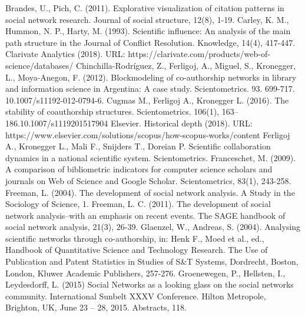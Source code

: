 \documentclass[11pt]{article} %
\begin{document}
\begin{thebibliography}{99}
   Brandes, U., Pich, C. (2011). Explorative visualization of citation patterns in social network research. Journal of social structure, 12(8), 1-19.
   Carley, K. M., Hummon, N. P., Harty, M. (1993). Scientific influence: An analysis of the main path structure in the Journal of Conflict Resolution. Knowledge, 14(4), 417-447.
   Clarivate Analytics (2018). URL: https://clarivate.com/products/web-of-science/databases/
   Chinchilla-Rodríguez, Z., Ferligoj, A., Miguel, S., Kronegger, L., Moya-Anegon, F. (2012). Blockmodeling of co-authorship networks in library and information science in Argentina: A case study. Scientometrics. 93. 699-717. 10.1007/s11192-012-0794-6.
   Cugmas M., Ferligoj A., Kronegger L. (2016). The stability of coauthorship structures. Scientometrics. 106(1), 163–186.10.1007/s1119201517904
   Elsevier. Historical depth (2018). URL: https://www.elsevier.com/solutions/scopus/how-scopus-works/content
   Ferligoj A., Kronegger L., Mali F., Snijders T., Doreian P. Scientific collaboration dynamics in a national scientific system. Scientometrics.
   Franceschet, M. (2009). A comparison of bibliometric indicators for computer science scholars and journals on Web of Science and Google Scholar. Scientometrics, 83(1), 243-258.
   Freeman, L. (2004). The development of social network analysis. A Study in the Sociology of Science, 1.
   Freeman, L. C. (2011). The development of social network analysis–with an emphasis on recent events. The SAGE handbook of social network analysis, 21(3), 26-39.
   Glaenzel, W., Andreas, S. (2004). Analysing scientific networks through co-authorship, in: Henk F., Moed et al., ed., Handbook of Quantitative Science and Technology Research. The Use of Publication and Patent Statistics in Studies of S\&T Systems, Dordrecht, Boston, London, Kluwer Academic Publishers, 257-276.
   Groenewegen, P., Hellsten, I., Leydesdorff, L. (2015) Social Networks as a looking glass on the social networks community. International Sunbelt XXXV Conference. Hilton Metropole, Brighton, UK, June 23 – 28, 2015. Abstracts, 118. 

\end{thebibliography}
\end{document}
